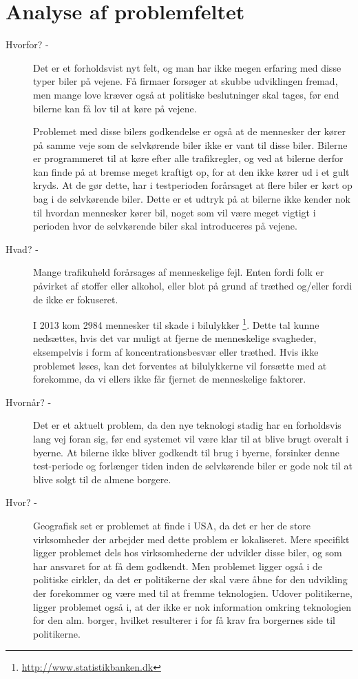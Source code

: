 \documentclass{article}
\begin{document}
	\section*{Analyse af problemfeltet}
	\begin{description}
		\item[Hvorfor? -] Det er et forholdsvist nyt felt, og man har ikke megen erfaring med disse typer biler på vejene. Få firmaer forsøger at skubbe udviklingen fremad, men mange love kræver også at politiske beslutninger skal tages, før end bilerne kan få lov til at køre på vejene.

		Problemet med disse bilers godkendelse er også at de mennesker der kører på samme veje som de selvkørende biler ikke er vant til disse biler. Bilerne er programmeret til at køre efter alle trafikregler, og ved at bilerne derfor kan finde på at bremse meget kraftigt op, for at den ikke kører ud i et gult kryds. At de gør dette, har i testperioden forårsaget at flere biler er kørt op bag i de selvkørende biler. Dette er et udtryk på at bilerne ikke kender nok til hvordan mennesker kører bil, noget som vil være meget vigtigt i perioden hvor de selvkørende biler skal introduceres på vejene.

		\item[Hvad? -] Mange trafikuheld forårsages af menneskelige fejl. Enten fordi folk er påvirket af stoffer eller alkohol, eller blot på grund af træthed og/eller fordi de ikke er fokuseret.

		I 2013 kom 2984 mennesker til skade i bilulykker \footnote{\url{http://www.statistikbanken.dk}}. Dette tal kunne nedsættes, hvis det var muligt at fjerne de menneskelige svagheder, eksempelvis i form af koncentrationsbesvær eller træthed. Hvis ikke problemet løses, kan det forventes at bilulykkerne vil forsætte med at forekomme, da vi ellers ikke får fjernet de menneskelige faktorer. 

		\item[Hvornår? -] Det er et aktuelt problem, da den nye teknologi stadig har en forholdsvis lang vej foran sig, før end systemet vil være klar til at blive brugt overalt i byerne. At bilerne ikke bliver godkendt til brug i byerne, forsinker denne test-periode og forlænger tiden inden de selvkørende biler er gode nok til at blive solgt til de almene borgere.

		\item[Hvor? -] Geografisk set er problemet at finde i USA, da det er her de store virksomheder der arbejder med dette problem er lokaliseret. Mere specifikt ligger problemet dels hos virksomhederne der udvikler disse biler, og som har ansvaret for at få dem godkendt. Men problemet ligger også i de politiske cirkler, da det er politikerne der skal være åbne for den udvikling der forekommer og være med til at fremme teknologien.
		Udover politikerne, ligger problemet også i, at der ikke er nok information omkring teknologien for den alm. borger, hvilket resulterer i for få krav fra borgernes side til politikerne.


\end{description}
\end{document}

